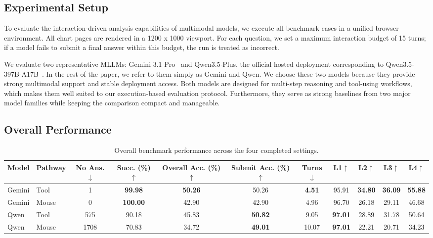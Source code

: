 \documentclass[review,journal,hideappendix]{vgtc} %
\begin{document}
\subsection{Experimental Setup}

To evaluate the interaction-driven analysis capabilities of multimodal models, we execute all benchmark cases in a unified browser environment. All chart pages are rendered in a 1200 x 1000 viewport. For each question, we set a maximum interaction budget of 15 turns; if a model fails to submit a final answer within this budget, the run is treated as incorrect.

We evaluate two representative MLLMs: Gemini 3.1 Pro~\cite{googledeepmind2026gemini31pro} and Qwen3.5-Plus, the official hosted deployment corresponding to Qwen3.5-397B-A17B~\cite{qwenteam2026qwen35}. In the rest of the paper, we refer to them simply as Gemini and Qwen. We choose these two models because they provide strong multimodal support and stable deployment access. Both models are designed for multi-step reasoning and tool-using workflows, which makes them well suited to our execution-based evaluation protocol. Furthermore, they serve as strong baselines from two major model families while keeping the comparison compact and manageable.

\subsection{Overall Performance}

\begin{table}[t]
	\centering
	\caption{
		Overall benchmark performance across the four completed settings. 
	}
	\label{tab:overall_performance}
	\scriptsize
	\begin{tabular}{ll|cccc|ccccc}
		\toprule
		Model          & Pathway  & No Ans.$\downarrow$ & Succ. (\%)$\uparrow$ & Overall Acc. (\%)$\uparrow$ & Submit Acc. (\%)$\uparrow$ & Turns$\downarrow$ & L1$\uparrow$   & L2$\uparrow$   & L3$\uparrow$   & L4$\uparrow$   \\
		\midrule
		Gemini & Tool & 1         & \textbf{99.98}   & \textbf{50.26}      & 50.26             & \textbf{4.51}   & 95.91          & \textbf{34.80} & \textbf{36.09} & \textbf{55.88} \\
		Gemini & Mouse    & 0         & \textbf{100.00}  & 42.90               & 42.90             & 4.96            & 96.70          & 26.18          & 29.11          & 46.68          \\
		\midrule
        Qwen  & Tool & 575       & 90.18            & 45.83               & \textbf{50.82}    & 9.05            & \textbf{97.01} & 28.89          & 31.78          & 50.64          \\
		Qwen  & Mouse    & 1708      & 70.83            & 34.72               & \textbf{49.01}    & 10.07           & \textbf{97.01} & 22.21          & 20.71          & 34.23          \\
		\bottomrule
	\end{tabular}
\end{table}
\end{document}

